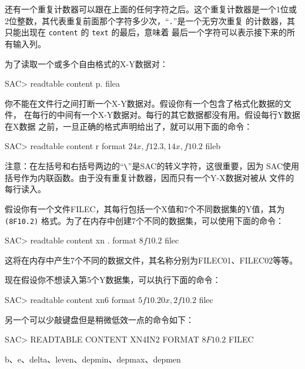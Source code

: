 还有一个重复计数器可以跟在上面的任何字符之后。这个重复计数器是一个1位或
2位整数，其代表重复前面那个字符多少次，``\texttt{.}''是一个无穷次重复
的计数器，其只能出现在 \texttt{content} 的 \texttt{text} 的最后，意味着
最后一个字符可以表示接下来的所有输入列。

为了读取一个或多个自由格式的X-Y数据对：
\begin{SACCode}
SAC> readtable content p. filea
\end{SACCode}

你不能在文件行之间打断一个X-Y数据对。假设你有一个包含了格式化数据的文件，
在每行的中间有一个X-Y数据对。每行的其它数据都没有用。假设每行Y数据在X数据
之前，一旦正确的格式声明给出了，就可以用下面的命令：
\begin{SACCode}
SAC> readtable content r format \(24x,f12.3,14x,f10.2\) fileb
\end{SACCode}
注意：在左括号和右括号两边的``\verb|\|''是SAC的转义字符，这很重要，因为
SAC使用括号作为内联函数。由于没有重复计数器，因而只有一个Y-X数据对被从
文件的每行读入。

假设你有一个文件FILEC，其每行包括一个X值和7个不同数据集的Y值，其为
\texttt{(8F10.2)} 格式。为了在内存中创建7个不同的数据集，可以使用下面的命令：
\begin{SACCode}
SAC> readtable content xn . format \(8f10.2\) filec
\end{SACCode}
这将在内存中产生7个不同的数据文件，其名称分别为FILEC01、FILEC02等等。

现在假设你不想读入第5个Y数据集，可以执行下面的命令：
\begin{SACCode}
SAC> readtable content xn6 format \(5f10.20x,2f10.2\) filec
\end{SACCode}
另一个可以少敲键盘但是稍微低效一点的命令如下：
\begin{SACCode}
SAC> READTABLE CONTENT XN4IN2 FORMAT \(8F10.2\) FILEC
\end{SACCode}

b、e、delta、leven、depmin、depmax、depmen
